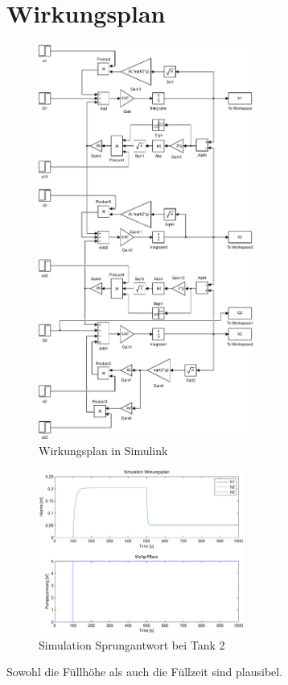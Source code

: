 \section{Wirkungsplan}
\begin{figure}[h!]
    \centering
    \includegraphics[width=0.63\textwidth]{03/wirkungsplan_mdl.pdf}
    \caption{Wirkungsplan in Simulink}
    \label{fig:03_mdl}
\end{figure}
\begin{figure}[h!]
    \centering
    \includegraphics[width=0.6\textwidth]{03/sim_0.pdf}
    \caption{Simulation Sprungantwort bei Tank 2}
    \label{fig:03_sim}
\end{figure}
Sowohl die Füllhöhe als auch die Füllzeit sind plausibel. 

